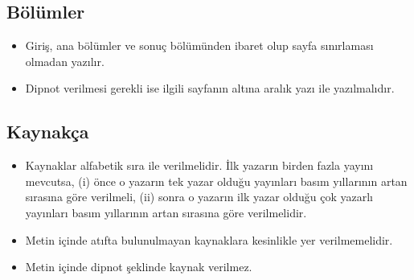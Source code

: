 \subsection{Bölümler}
\begin{itemize}
\item Giriş, ana bölümler ve sonuç bölümünden ibaret olup sayfa sınırlaması olmadan yazılır.
\item Dipnot verilmesi gerekli ise ilgili sayfanın altına aralık yazı ile yazılmalıdır.
\end{itemize}

\subsection{Kaynakça}
\begin{itemize}
\item Kaynaklar alfabetik sıra ile verilmelidir. İlk yazarın birden fazla yayını mevcutsa, (i) önce o yazarın tek yazar olduğu yayınları basım yıllarının artan sırasına göre verilmeli, (ii) sonra o yazarın ilk yazar olduğu çok yazarlı yayınları basım yıllarının artan sırasına göre verilmelidir.
\item Metin içinde atıfta bulunulmayan kaynaklara kesinlikle yer verilmemelidir.
\item Metin içinde dipnot şeklinde kaynak verilmez.
\end{itemize}

